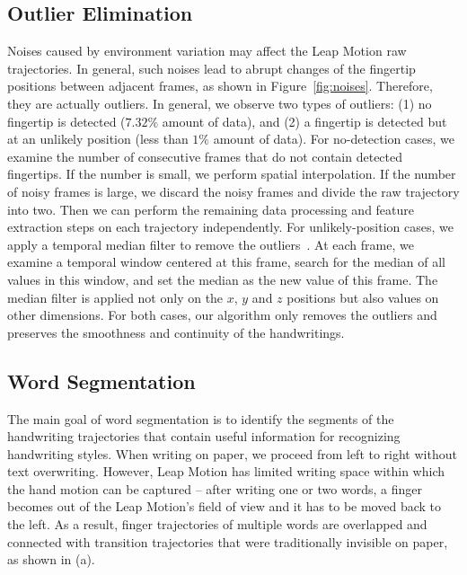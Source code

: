 \subsection{Outlier Elimination}
Noises caused by environment variation may affect the Leap Motion raw trajectories. In general, such noises lead to abrupt changes of the fingertip positions between adjacent frames, as shown in Figure~\ref{fig:noises}. 
Therefore, they are actually outliers. In general, we observe two types of outliers: (1) no fingertip is detected ($7.32\%$ amount of data), and (2) a fingertip is detected but at an unlikely position (less than $1\%$ amount of data). For no-detection cases, we examine the number of consecutive frames that do not contain detected fingertips. If the number is small, we perform spatial interpolation. If the number of noisy frames is large, we discard the noisy frames and divide the raw trajectory into two. 
Then we can perform the remaining data processing and feature extraction steps on each trajectory independently. 
For unlikely-position cases, we apply a temporal median filter to remove the outliers~\cite{SaltNoise}. 
At each frame, we examine a temporal window centered at this frame, search for the median of all values in this window,  and set the median as the new value of this frame. 
The median filter is applied not only on the $x$, $y$ and $z$ positions but also values on other dimensions. For both cases, our algorithm only removes the outliers and preserves the smoothness and continuity of the handwritings. 








 \subsection{Word Segmentation}

The main goal of word segmentation is to identify the segments of the handwriting trajectories that contain useful information for recognizing handwriting styles. 
When writing on paper, we proceed from  left to right %
without text overwriting. %
However, Leap Motion has limited writing space within which the hand motion can be captured -- after writing one or two words, a finger becomes out of the Leap Motion's field of view and it has to be moved back to the left.
As a result, finger trajectories of multiple words are overlapped and connected with transition trajectories that were traditionally invisible on paper, as shown in  (a). %

